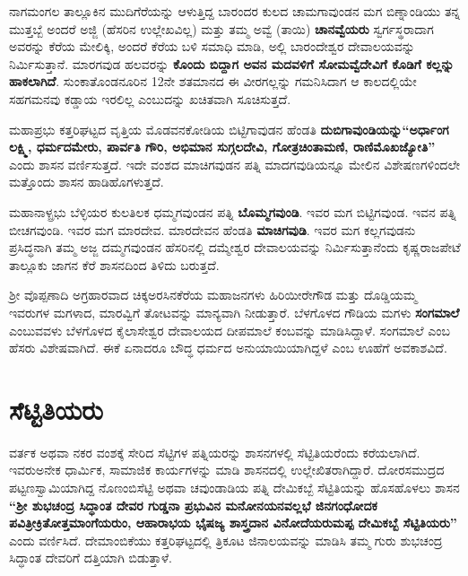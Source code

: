 ನಾಗಮಂಗಲ ತಾಲ್ಲೂಕಿನ ಮುದಿಗೆರೆಯನ್ನು ಆಳುತ್ತಿದ್ದ ಬಾರಂದರ ಕುಲದ ಚಾಮಗಾವುಂಡನ ಮಗ ಬಿಣ್ನಾಂಡಿಯು ತನ್ನ ಮುತ್ತಬ್ಬೆ ಅಂದರೆ ಅಜ್ಜಿ (ಹೆಸರಿನ ಉಲ್ಲೇಖವಿಲ್ಲ) ಮತ್ತು ತಮ್ಮ ಅವ್ವೆ (ತಾಯಿ) \textbf{ಚಾನವ್ವೆಯರು} ಸ್ವರ್ಗಸ್ಥರಾದಾಗ ಅವರನ್ನು ಕೆರೆಯ ಮೇಲಿಕ್ಕಿ, ಅಂದರೆ ಕೆರೆಯ ಬಳಿ ಸಮಾಧಿ ಮಾಡಿ, ಅಲ್ಲಿ ಬಾರಂದೇಶ್ವರ ದೇವಾಲಯವನ್ನು ನಿರ್ಮಿಸುತ್ತಾನೆ. ಮಾರಗವುಡ ಹಲವರನ್ನು \textbf{ಕೊಂದು ಬಿದ್ದಾಗ ಅವನ ಮದವಳಿಗೆ ಸೋಮವ್ವೆದೇವಿಗೆ ಕೊಡಿಗೆ ಕಲ್ಲನ್ನು ಹಾಕಲಾಗಿದೆ}. ಸುಂಕಾತೊಂಡನೂರಿನ 12ನೇ ಶತಮಾನದ ಈ ವೀರಗಲ್ಲನ್ನು ಗಮನಿಸಿದಾಗ ಆ ಕಾಲದಲ್ಲಿಯೇ ಸಹಗಮನವು ಕಡ್ಡಾಯ ಇರಲಿಲ್ಲ ಎಂಬುದನ್ನು ಖಚಿತವಾಗಿ ಸೂಚಿಸುತ್ತದೆ.

ಮಹಾಪ್ರಭು ಕತ್ತರಿಘಟ್ಟದ ವೃತ್ತಿಯ ಮೊಡವನಕೋಡಿಯ ಬಿಟ್ಟಿಗಾವುಡನ ಹೆಂಡತಿ \textbf{ದುಬಿಗಾವುಂಡಿಯನ್ನು}\break \textbf{“ಅರ್ಧಾಂಗ ಲಕ್ಷ್ಮಿ, ಧರ್ಮದಮೇರು, ಪಾರ್ವತಿ ಗೌರಿ, ಅಭಿಮಾನ ಸುಗ್ಗಲದೇವಿ, ಗೋತ್ರಚಿಂತಾಮಣಿ, ರಾಣಿಮೊಖಜ್ಯೋತಿ”} ಎಂದು ಶಾಸನ ವರ್ಣಿಸುತ್ತದೆ. ಇದೇ ವಂಶದ ಮಾಚಿಗವುಡನ ಪತ್ನಿ ಮಾದಗವುಡಿಯನ್ನೂ ಮೇಲಿನ ವಿಶೇಷಣಗಳಿಂದಲೇ ಮತ್ತೊಂದು ಶಾಸನ ಹಾಡಿಹೊಗಳುತ್ತದೆ.

ಮಹಾನಾಳ್ಪ್ರಭು ಬೆಳ್ಳಿಯರ ಕುಲತಿಲಕ ಧಮ್ಮಗವುಂಡನ ಪತ್ನಿ \textbf{ಬೊಮ್ಮಗವುಂಡಿ}. ಇವರ ಮಗ ಬಿಟ್ಟಿಗವುಂಡ. ಇವನ ಪತ್ನಿ ಬೀಚಗವುಂಡಿ. ಇವರ ಮಗ ಮಾರದೇವ. ಮಾರದೇವನ ಹೆಂಡತಿ \textbf{ಮಾಚಿಗವುಡಿ}. ಇವರ ಮಗ ಕಲ್ಲಗವುಡನು ಪ್ರಸಿದ್ಧನಾಗಿ ತಮ್ಮ ಅಜ್ಜ ದಮ್ಮಗವುಂಡನ ಹೆಸರಿನಲ್ಲಿ ದಮ್ಮೇಶ್ವರ ದೇವಾಲಯವನ್ನು ನಿರ್ಮಿಸುತ್ತಾನೆಂದು ಕೃಷ್ಣರಾಜಪೇಟೆ ತಾಲ್ಲೂಕು ಜಾಗನ ಕೆರೆ ಶಾಸನದಿಂದ ತಿಳಿದು ಬರುತ್ತದೆ.

ಶ‍್ರೀ ವೊಪ್ಪಣಾದಿ ಅಗ್ರಹಾರವಾದ ಚಿಕ್ಕಅರಸಿನಕೆರೆಯ ಮಹಾಜನಗಳು ಹಿರಿಯೀರೇಗೌಡ ಮತ್ತು ದೊಡ್ಡಿಯಮ್ಮ ಇವರುಗಳ ಮಗಳಾದ, ಮಾರವ್ವಿಗೆ ತೋಟವನ್ನು ಮಾನ್ಯವಾಗಿ ನೀಡುತ್ತಾರೆ. ಬೆಳಗೊಳದ ಗೌಡಿಯ ಮಗಳು \textbf{ಸಂಗಮಾಲೆ} ಎಂಬುವವಳು ಬೆಳಗೊಳದ ಕೈಲಾಸೇಶ್ವರ ದೇವಾಲಯದ ದೀಪಮಾಲೆ ಕಂಬವನ್ನು ಮಾಡಿಸಿದ್ದಾಳೆ. ಸಂಗಮಾಲೆ ಎಂಬ ಹೆಸರು ವಿಶೇಷವಾಗಿದೆ. ಈಕೆ ಏನಾದರೂ ಬೌದ್ಧ ಧರ್ಮದ ಅನುಯಾಯಿಯಾಗಿದ್ದಳೆ ಎಂಬ ಊಹೆಗೆ ಅವಕಾಶವಿದೆ.


\section{ಸೆಟ್ಟಿತಿಯರು}

ವರ್ತಕ ಅಥವಾ ನಕರ ವಂಶಕ್ಕೆ ಸೇರಿದ ಸೆಟ್ಟಿಗಳ ಪತ್ನಿಯರನ್ನು ಶಾಸನಗಳಲ್ಲಿ ಸೆಟ್ಟಿತಿಯರೆಂದು ಕರೆಯಲಾಗಿದೆ. ಇವರು\break ಅನೇಕ ಧಾರ್ಮಿಕ, ಸಾಮಾಜಿಕ ಕಾರ್ಯಗಳನ್ನು ಮಾಡಿ ಶಾಸನದಲ್ಲಿ ಉಲ್ಲೇಖಿತರಾಗಿದ್ದಾರೆ. ದೋರಸಮುದ್ರದ ಪಟ್ಟಣಸ್ವಾಮಿ\-ಯಾಗಿದ್ದ ನೊಣಂಬಿಸೆಟ್ಟಿ ಅಥವಾ ಚವುಂಡಾಡಿಯ ಪತ್ನಿ ದೇಮಿಕಬ್ಬೆ ಸೆಟ್ಟಿತಿಯನ್ನು ಹೊಸಹೊಳಲು ಶಾಸನ \textbf{“ಶ‍್ರೀ ಶುಭಚಂದ್ರ ಸಿದ್ಧಾಂತ ದೇವರ ಗುಡ್ಡನಾ ಪ್ರಭುವಿನ ಮನೋನಯನವಲ್ಲಭೆ ಜಿನಗಂಧೋದಕ ಪವಿತ್ರೀಕ್ರಿತೋತ್ತಮಾಂಗೆಯರುಂ, ಆಹಾರಾಭಯ ಭೈಷಜ್ಯ ಶಾಸ್ತ್ರದಾನ ವಿನೋದೆಯರುಮಪ್ಪ ದೇಮಿಕಬ್ಬೆ ಸೆಟ್ಟಿತಿಯರು”} ಎಂದು ವರ್ಣಿಸಿದೆ. ದೇಮಾಂಬಿಕೆಯು ಕತ್ತರಿಘಟ್ಟದಲ್ಲಿ ತ್ರಿಕೂಟ ಜಿನಾಲಯವನ್ನು ಮಾಡಿಸಿ ತಮ್ಮ ಗುರು ಶುಭಚಂದ್ರ ಸಿದ್ಧಾಂತ ದೇವರಿಗೆ ದತ್ತಿಯಾಗಿ ಬಿಡುತ್ತಾಳೆ.

